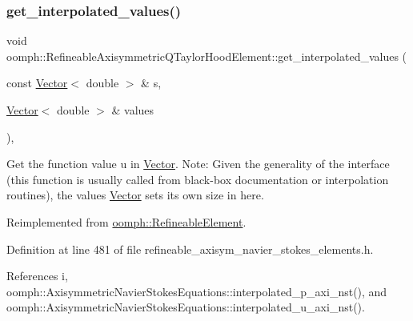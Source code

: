 \subsubsection{\texorpdfstring{get\+\_\+interpolated\+\_\+values()}{get\_interpolated\_values()}\hspace{0.1cm}{\footnotesize\ttfamily [1/2]}}
{\footnotesize\ttfamily void oomph\+::\+Refineable\+Axisymmetric\+Q\+Taylor\+Hood\+Element\+::get\+\_\+interpolated\+\_\+values (\begin{DoxyParamCaption}\item[{const \hyperlink{classoomph_1_1Vector}{Vector}$<$ double $>$ \&}]{s,  }\item[{\hyperlink{classoomph_1_1Vector}{Vector}$<$ double $>$ \&}]{values }\end{DoxyParamCaption})\hspace{0.3cm}{\ttfamily [inline]}, {\ttfamily [virtual]}}



Get the function value u in \hyperlink{classoomph_1_1Vector}{Vector}. Note\+: Given the generality of the interface (this function is usually called from black-\/box documentation or interpolation routines), the values \hyperlink{classoomph_1_1Vector}{Vector} sets its own size in here. 



Reimplemented from \hyperlink{classoomph_1_1RefineableElement_ad9a4f92880668a2373326d8306365c43}{oomph\+::\+Refineable\+Element}.



Definition at line 481 of file refineable\+\_\+axisym\+\_\+navier\+\_\+stokes\+\_\+elements.\+h.



References i, oomph\+::\+Axisymmetric\+Navier\+Stokes\+Equations\+::interpolated\+\_\+p\+\_\+axi\+\_\+nst(), and oomph\+::\+Axisymmetric\+Navier\+Stokes\+Equations\+::interpolated\+\_\+u\+\_\+axi\+\_\+nst().

\mbox{\label{classoomph_1_1RefineableAxisymmetricQTaylorHoodElement_aa3313e6c8f4aad4472807339723d3314}} 
